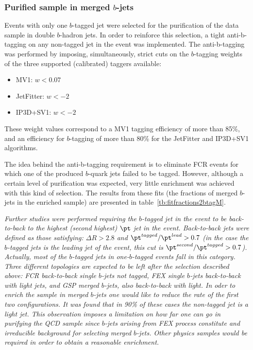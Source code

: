 \subsubsection{Purified sample in merged $b$-jets}

Events with only one $b$-tagged jet were selected for the purification of the data sample in double $b$-hadron jets.  In order to reinforce this selection, a tight anti-b-tagging on any non-tagged jet in the event was implemented.  The anti-b-tagging was performed by imposing, simultaneously, strict cuts on the $b$-tagging weights of the three supported (calibrated) taggers available:
%
\begin{itemize}
\item
MV1:  $w < 0.07$  
\item
JetFitter:  $w < -2$
\item
IP3D+SV1:  $w < -2$
\end{itemize}
%
These weight values correspond to a MV1 tagging efficiency of more than 85\%, and an efficiency for $b$-tagging of more than 80\% for the JetFitter and IP3D+SV1 algorithms. 

The idea behind the anti-b-tagging requirement is to eliminate FCR events for which one of the produced $b$-quark jets failed to be tagged. However, although a certain level of purification was expected, very little enrichment was achieved with this kind of selection. The results from these fits (the fractions of merged $b$-jets in the enriched sample) are presented in  table~\ref{tb:fitfractions2btagM}.

\emph{Further studies were performed requiring the $b$-tagged jet in the event to be back-to-back to the highest (second highest) $\pt$ jet in the event.  Back-to-back jets were defined as those satisfying:  $\Delta R>2.8$ and  $\pt^{tagged}/\pt^{lead} > 0.7$  (in the case the $b$-tagged jets is the leading jet of the event, this cut is $\pt^{second}/\pt^{tagged} > 0.7$). Actually, most of the $b$-tagged jets in one-$b$-tagged events fall in this category. Three different topologies are expected to be left after the selection described above: FCR back-to-back single $b$-jets not tagged,  FEX single $b$-jets back-to-back with light jets, and GSP merged $b$-jets, also back-to-back with light. In oder to enrich the sample in merged $b$-jets one would like to reduce the rate of the first two configurations.  It was found that in 90\% of these cases the  non-tagged jet is a light jet. This observation imposes a limitation on how far one can go in purifying the QCD sample since $b$-jets arising from FEX process constitute and irreducible background for selecting merged $b$-jets. Other physics samples would be required in order to obtain a reasonable enrichment.}

